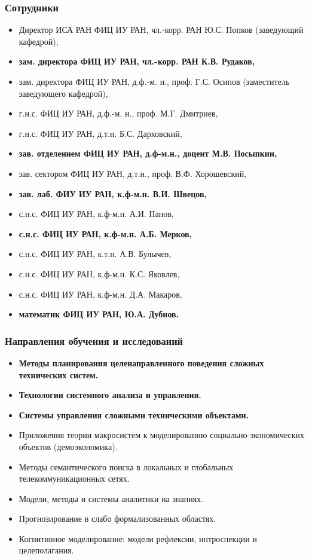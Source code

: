 \documentclass[default]{beamer}
\begin{document}
	\begin{frame}
		\frametitle{Сотрудники}
		\scriptsize
		\begin{itemize}
			\item Директор ИСА РАН ФИЦ ИУ РАН, чл.-корр. РАН Ю.С. Попков (заведующий кафедрой),
			\item \textbf{зам. директора ФИЦ ИУ РАН, чл.-корр. РАН К.В. Рудаков,}
			\item зам. директора ФИЦ ИУ РАН, д.ф.-м. н., проф. Г.С. Осипов (заместитель заведующего кафедрой),
			\item г.н.с. ФИЦ ИУ РАН, д.ф.-м. н., проф. М.Г. Дмитриев,
			\item г.н.с. ФИЦ ИУ РАН, д.т.н. Б.С. Дарховский,
			\item \textbf{зав. отделением ФИЦ ИУ РАН, д.ф-м.н., доцент М.В. Посыпкин,}
			\item зав. сектором ФИЦ ИУ РАН, д.т.н., проф. В.Ф. Хорошевский,
			\item \textbf{зав. лаб. ФИУ ИУ РАН, к.ф-м.н. В.И. Швецов,}
			\item с.н.с. ФИЦ ИУ РАН, к.ф-м.н. А.И. Панов,
			\item \textbf{с.н.с. ФИЦ ИУ РАН, к.ф-м.н. А.Б. Мерков,}
			\item с.н.с. ФИЦ ИУ РАН, к.т.н. А.В. Булычев,
			\item с.н.с. ФИЦ ИУ РАН, к.ф-м.н. К.С. Яковлев,
			\item с.н.с. ФИЦ ИУ РАН, к.ф-м.н. Д.А. Макаров,
			\item \textbf{математик ФИЦ ИУ РАН, Ю.А. Дубнов.}
			
		\end{itemize}
	\end{frame}
	
	\begin{frame}
		\frametitle{Направления обучения и исследований}
		
		\begin{itemize}
			\item \textbf{Методы планирования целенаправленного поведения сложных технических систем.}
			\item \textbf{Технологии системного анализа и управления.}			
			\item \textbf{Системы управления сложными техническими объектами.}
			\item Приложения теории макросистем к моделированию социально-экономических объектов (демоэкономика). 
			\item Методы семантического поиска в локальных и глобальных телекоммуникационных сетях.
			\item Модели, методы и системы аналитики на знаниях. 
			\item Прогнозирование в слабо формализованных областях.
			\item Когнитивное моделирование: модели рефлексии, интроспекции и целеполагания.
		\end{itemize}
	\end{frame}
	
\end{document}
